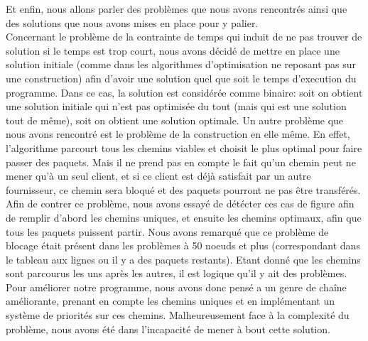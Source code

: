 \documentclass[a4paper,10pt]{article}
\begin{document}
\hspace{0.5cm}Et enfin, nous allons parler des problèmes que nous avons rencontrés ainsi que des
solutions que nous avons mises en place pour y palier. \\ Concernant le problème de la contrainte de 
temps qui induit de ne pas trouver de solution si le temps est trop court, nous avons décidé de 
mettre en place une solution initiale (comme dans les algorithmes d'optimisation ne reposant pas sur 
une construction) afin d'avoir une solution quel que soit le temps d'execution du programme. Dans 
ce cas, la solution est considérée comme binaire: soit on obtient une solution initiale qui n'est pas 
optimisée du tout (mais qui est une solution tout de même), soit on obtient une solution optimale. 
Un autre problème que nous avons rencontré est le problème de la construction en elle même.
En effet, l'algorithme parcourt tous les chemins viables et choisit le plus optimal pour faire
passer des paquets. Mais il ne prend pas en compte le fait qu'un chemin peut ne mener qu'à un seul 
client, et si ce client est déjà satisfait par un autre fournisseur, ce chemin sera bloqué et 
des paquets pourront ne pas être transférés. \\Afin de contrer ce problème, nous avons essayé de 
détécter ces cas de figure afin de remplir d'abord les chemins uniques, et ensuite les chemins 
optimaux, afin que tous les paquets puissent partir. Nous avons remarqué que ce problème de blocage
était présent dans les problèmes à 50 noeuds et plus (correspondant dans le tableau aux lignes ou il
y a des paquets restants). Etant donné que les chemins sont parcourus 
les uns après les autres, il est logique qu'il y ait des problèmes. Pour améliorer notre programme,
nous avons donc pensé a un genre de chaîne améliorante, prenant en compte les chemins uniques et 
en implémentant un système de priorités sur ces chemins. Malheureusement face à la complexité du 
problème, nous avons été dans l'incapacité de mener à bout cette solution.
\end{document}
